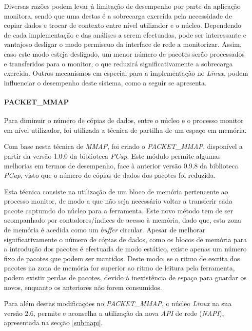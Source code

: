 Diversas razões podem levar à limitação de desempenho por parte da aplicação monitora, sendo que uma destas é a sobrecarga exercida pela necessidade de copiar dados e trocar de contexto entre nível utilizador e o núcleo.
Dependendo de cada implementação e das análises a serem efectuadas, pode ser interessante e vantajoso desligar o modo permiscuo da interface de rede a monitorizar.
Assim, caso este modo esteja desligado, um menor número de pacotes serão processados e transferidos para o monitor, o que reduzirá significativamente a sobrecarga exercida.
Outros mecanismos em especial para a implementação no \textit{Linux}, podem influenciar o desempenho deste sistema, como a seguir se apresenta.
 
\paragraph*{PACKET\_MMAP}

Para diminuir o número de cópias de dados, entre o núcleo e o processo monitor em nível utilizador, foi utilizada a técnica de partilha de um espaço em memória.

Com base nesta técnica de \textit{MMAP}, foi criado o \textit{PACKET\_MMAP}, disponível a partir da versão 1.0.0 da biblioteca \textit{PCap}.
Este módulo permite algumas melhorias em termos de desempenho, face à anterior versão 0.9.8 da biblioteca \textit{PCap}, visto que o número de cópias de dados dos pacotes foi reduzida.

Esta técnica consiste na utilização de um bloco de memória pertencente ao processo monitor, de modo a que não seja necessário voltar a transferir cada pacote capturado do núcleo para a ferramenta.
Este novo método tem de ser acompanhado por contadores/índices de acesso à memória, dado que, esta zona de memória é acedida como um \textit{buffer} circular.
Apesar de melhorar significativamente o número de cópias de dados, como os blocos de memória para a introdução dos pacotes é efectuada de modo estático, existe apenas um número fixo de pacotes que podem ser mantidos.
Deste modo, se o ritmo de escrita dos pacotes na zona de memória for superior ao ritmo de leitura pela ferramenta, podem existir perdas de pacotes, devido à inexistência de espaço para guardar os novos, enquanto os anteriores não forem consumidos.

Para além destas modificações no \textit{PACKET\_MMAP}, o núcleo \textit{Linux} na sua versão 2.6, permite e aconselha a utilização da nova \textit{API} de rede (\textit{NAPI}), apresentada na secção \ref{sub:napi}.

